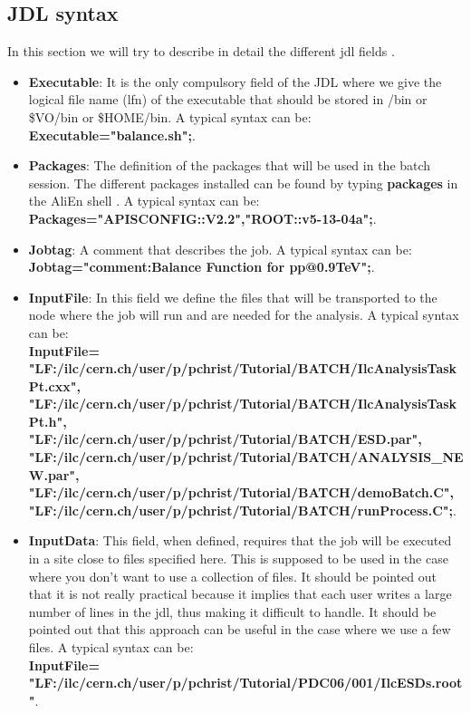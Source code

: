 \subsection{JDL syntax}

In this section we will try to describe in detail the different jdl fields \cite{Note:RefGSHELL}.

\begin{itemize}
\item \textbf{Executable}: It is the only compulsory field of the JDL where we give the logical file name (lfn) of the executable that should be stored in /bin or \$VO/bin or \$HOME/bin. A typical syntax can be: \\{\ttfamily \textbf{Executable="balance.sh";}}.

\item \textbf{Packages}: The definition of the packages that will be used in the batch session. The different packages installed can be found by typing \textbf{packages} in the AliEn shell \cite{Note:RefGSHELL}. A typical syntax can be: \\{\ttfamily \textbf{Packages={"APISCONFIG::V2.2","ROOT::v5-13-04a"};}}.

\item \textbf{Jobtag}: A comment that describes the job. A typical syntax can be: \\{\ttfamily \textbf{Jobtag={"comment:Balance Function for pp@0.9TeV"};}}.

\item \textbf{InputFile}: In this field we define the files that will be transported to the node where the job will run and are needed for the analysis. A typical syntax can be: \\{\ttfamily \textbf{InputFile= {\\"LF:/ilc/cern.ch/user/p/pchrist/Tutorial/BATCH/IlcAnalysisTaskPt.cxx",\\"LF:/ilc/cern.ch/user/p/pchrist/Tutorial/BATCH/IlcAnalysisTaskPt.h",\\"LF:/ilc/cern.ch/user/p/pchrist/Tutorial/BATCH/ESD.par", \\"LF:/ilc/cern.ch/user/p/pchrist/Tutorial/BATCH/ANALYSIS\_NEW.par", \\"LF:/ilc/cern.ch/user/p/pchrist/Tutorial/BATCH/demoBatch.C",\\"LF:/ilc/cern.ch/user/p/pchrist/Tutorial/BATCH/runProcess.C"};}}.

\item \textbf{InputData}: This field, when defined, requires that the job will be executed in a site close to files specified here. This is supposed to be used in the case where you don't want to use a collection of files. It should be pointed out that it is not really practical because it implies that each user writes a large number of lines in the jdl, thus making it difficult to handle. It should be pointed out that this approach can be useful in the case where we use a few files. A typical syntax can be: \\{\ttfamily \textbf{InputFile= {\\"LF:/ilc/cern.ch/user/p/pchrist/Tutorial/PDC06/001/IlcESDs.root"}}}.


\end{itemize}
